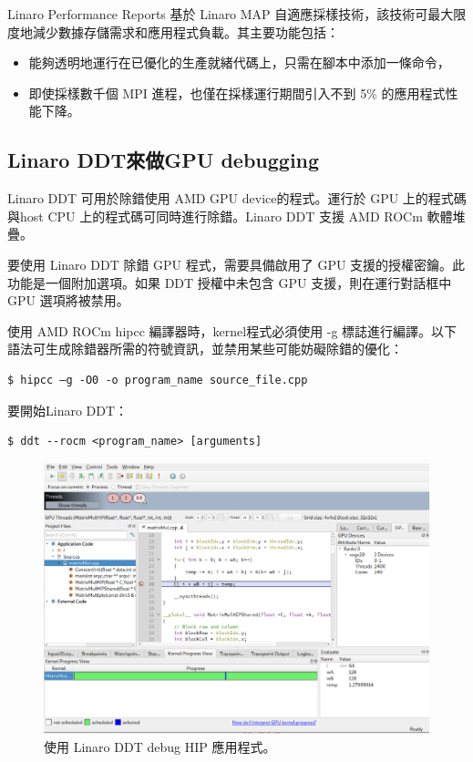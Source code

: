 Linaro Performance Reports 基於 Linaro MAP 自適應採樣技術，該技術可最大限度地減少數據存儲需求和應用程式負載。其主要功能包括：

\begin{itemize}
    \item 能夠透明地運行在已優化的生產就緒代碼上，只需在腳本中添加一條命令，
    \item 即使採樣數千個 MPI 進程，也僅在採樣運行期間引入不到 5\% 的應用程式性能下降。
\end{itemize}


\subsection{Linaro DDT來做GPU debugging}

Linaro DDT 可用於除錯使用 AMD GPU device的程式。運行於 GPU 上的程式碼與host CPU 上的程式碼可同時進行除錯。Linaro DDT 支援 AMD ROCm 軟體堆疊。

要使用 Linaro DDT 除錯 GPU 程式，需要具備啟用了 GPU 支援的授權密鑰。此功能是一個附加選項。如果 DDT 授權中未包含 GPU 支援，則在運行對話框中 GPU 選項將被禁用。

使用 AMD ROCm hipcc 編譯器時，kernel程式必須使用 -g 標誌進行編譯。以下語法可生成除錯器所需的符號資訊，並禁用某些可能妨礙除錯的優化：

\begin{lstlisting}
$ hipcc –g -O0 -o program_name source_file.cpp
\end{lstlisting}

要開始Linaro DDT：
\begin{lstlisting}
$ ddt --rocm <program_name> [arguments]
\end{lstlisting}

\begin{figure}
    \centering
    \includegraphics[width=0.9\linewidth]{FileAusiliari/Screenshots/Figure13-30.png}
    \caption{使用 Linaro DDT debug HIP 應用程式。}
    \label{fig:PAPI30}
\end{figure}

